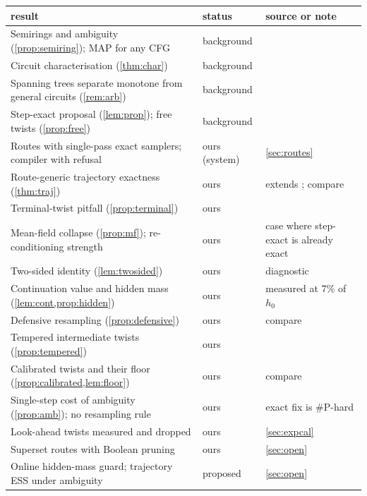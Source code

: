 \documentclass[11pt]{article}
\theoremstyle{definition}
\begin{document}
\begin{center}
\renewcommand{\arraystretch}{1.15}\small
\begin{tabular}{>{\raggedright}p{6.4cm}l>{\raggedright\arraybackslash}p{5cm}}
\toprule
result & status & source or note\\
\midrule
Semirings and ambiguity (\cref{prop:semiring}); MAP for any CFG & background & \cite{wang2024atlas}\\
Circuit characterisation (\cref{thm:char}) & background & \cite{broadrick2025,jvv86}\\
Spanning trees separate monotone from general circuits (\cref{rem:arb}) & background & \cite{jerrumsnir1982}\\
Step-exact proposal (\cref{lem:prop}); free twists (\cref{prop:free}) & background & \cite{twister,delmoral2004}\\
Routes with single-pass exact samplers; compiler with refusal & ours (system) & \cref{sec:routes}\\
Route-generic trajectory exactness (\cref{thm:traj}) & ours & extends \cite{twister}; compare \cite{dang2026icml}\\
Terminal-twist pitfall (\cref{prop:terminal}) & ours & \\
Mean-field collapse (\cref{prop:mf}); re-conditioning strength & ours & case where step-exact is already exact\\
Two-sided identity (\cref{lem:twosided}) & ours & diagnostic\\
Continuation value and hidden mass (\cref{lem:cont,prop:hidden}) & ours & measured at 7\% of $h_0$\\
Defensive resampling (\cref{prop:defensive}) & ours & compare \cite{hesterberg1995}\\
Tempered intermediate twists (\cref{prop:tempered}) & ours & \\
Calibrated twists and their floor (\cref{prop:calibrated,lem:floor}) & ours & compare \cite{heng2020}\\
Single-step cost of ambiguity (\cref{prop:amb}); no resampling rule & ours & exact fix is \#P-hard\\
Look-ahead twists measured and dropped & ours & \cref{sec:expcal}\\
Superset routes with Boolean pruning & ours & \cref{sec:open}\\
Online hidden-mass guard; trajectory ESS under ambiguity & proposed & \cref{sec:open}\\
\bottomrule
\end{tabular}
\end{center}
\end{document}
